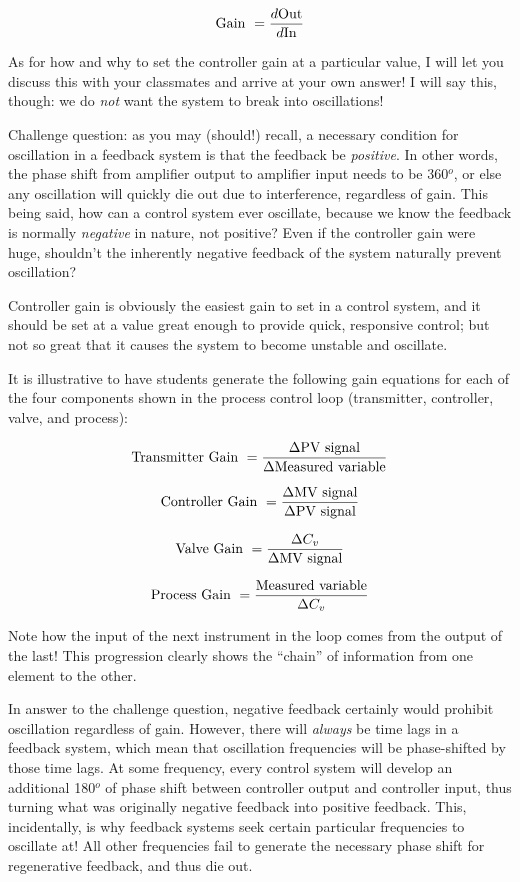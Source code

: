 $$\hbox{Gain } = {d \hbox{Out} \over d \hbox{In}}$$

As for how and why to set the controller gain at a particular value, I will let you discuss this with your classmates and arrive at your own answer!  I will say this, though: we do {\it not} want the system to break into oscillations!

\vskip 10pt

Challenge question: as you may (should!) recall, a necessary condition for oscillation in a feedback system is that the feedback be {\it positive}.  In other words, the phase shift from amplifier output to amplifier input needs to be 360$^{o}$, or else any oscillation will quickly die out due to interference, regardless of gain.  This being said, how can a control system ever oscillate, because we know the feedback is normally {\it negative} in nature, not positive?  Even if the controller gain were huge, shouldn't the inherently negative feedback of the system naturally prevent oscillation?







Controller gain is obviously the easiest gain to set in a control system, and it should be set at a value great enough to provide quick, responsive control; but not so great that it causes the system to become unstable and oscillate.

\vskip 10pt

It is illustrative to have students generate the following gain equations for each of the four components shown in the process control loop (transmitter, controller, valve, and process):

$$\hbox{Transmitter Gain } = {\Delta \hbox{PV signal} \over \Delta \hbox{Measured variable}}$$

$$\hbox{Controller Gain } = {\Delta \hbox{MV signal} \over \Delta \hbox{PV signal}}$$

$$\hbox{Valve Gain } = {\Delta C_v \over \Delta \hbox{MV signal}}$$

$$\hbox{Process Gain } = {\hbox{Measured variable} \over \Delta C_v}$$

Note how the input of the next instrument in the loop comes from the output of the last!  This progression clearly shows the ``chain'' of information from one element to the other.

\vskip 10pt

In answer to the challenge question, negative feedback certainly would prohibit oscillation regardless of gain.  However, there will {\it always} be time lags in a feedback system, which mean that oscillation frequencies will be phase-shifted by those time lags.  At some frequency, every control system will develop an additional 180$^{o}$ of phase shift between controller output and controller input, thus turning what was originally negative feedback into positive feedback.  This, incidentally, is why feedback systems seek certain particular frequencies to oscillate at!  All other frequencies fail to generate the necessary phase shift for regenerative feedback, and thus die out.

